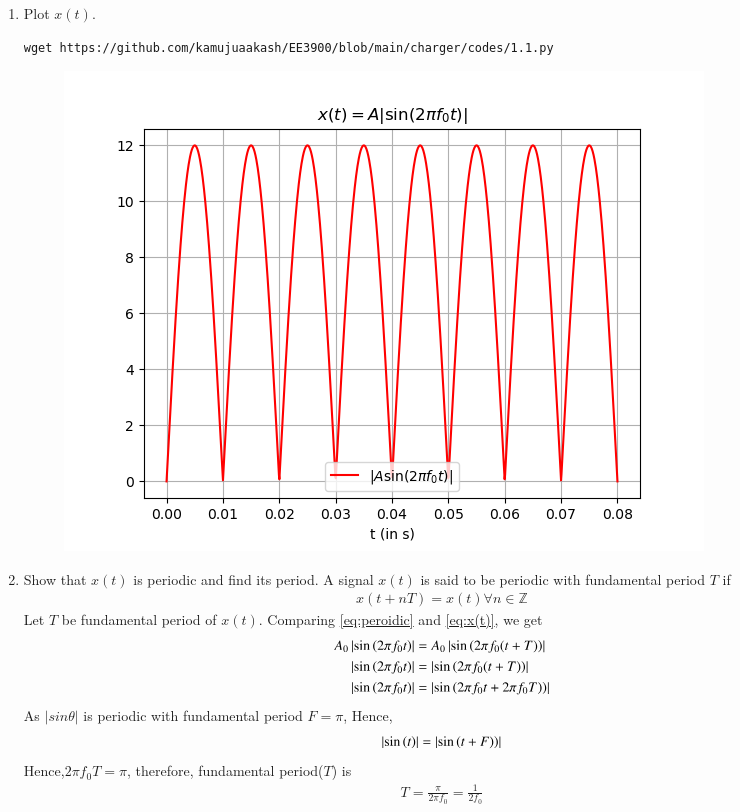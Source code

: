 \documentclass[journal,12pt,twocolumn]{IEEEtran}
\renewcommand\thesection{\arabic{section}}
\begin{document}
    \begin{enumerate}[label=\thesection.\arabic*
    ,ref=\thesection.\theenumi]
    \item Plot $x(t)$.\\
    \solution 
    \begin{lstlisting}
wget https://github.com/kamujuaakash/EE3900/blob/main/charger/codes/1.1.py
    \end{lstlisting}
    \begin{figure}[!ht]
			\centering
			\includegraphics[width=\columnwidth]{./figs/1.1.png}
			\caption{}
\end{figure}
    \item Show that $x(t)$ is periodic and find its period.
    \solution 
    A signal $x(t)$ is said to be periodic with fundamental period $T$ if
    \begin{align}
    \label{eq:peroidic}
    x(t+nT)=x(t) \forall n \in \mathbb{Z}
    \end{align}
Let $T$ be fundamental period of $x(t)$. Comparing \eqref{eq:peroidic} and \eqref{eq:x(t)}, we get
	\begin{align}
A_0\left\vert\sin\left(2\pi f_0 t\right)\right\vert&=A_0\left\vert\sin\left(2\pi f_0 (t+T)\right)\right\vert\\
\left\vert\sin\left(2\pi f_0 t\right)\right\vert&=\left\vert\sin\left(2\pi f_0 (t+T)\right)\right\vert\\
\left\vert\sin\left(2\pi f_0 t\right)\right\vert&=\left\vert\sin\left(2\pi f_0 t+2\pi f_0 T)\right)\right\vert
	\end{align}
As $|sin\theta|$ is periodic with fundamental period $F=\pi$, Hence,
    \begin{align}
\left\vert\sin\left(t\right)\right\vert=\left\vert\sin\left(t+F)\right)\right\vert
\end{align}
Hence,$2\pi f_0  T=\pi$, therefore, fundamental period($T$) is 
\begin{align}
\label{eq:ftp}
T=\frac{\pi}{2 \pi f_0}=\frac{1}{2f_0}
    \end{align}
    \end{enumerate}
\end{document}
